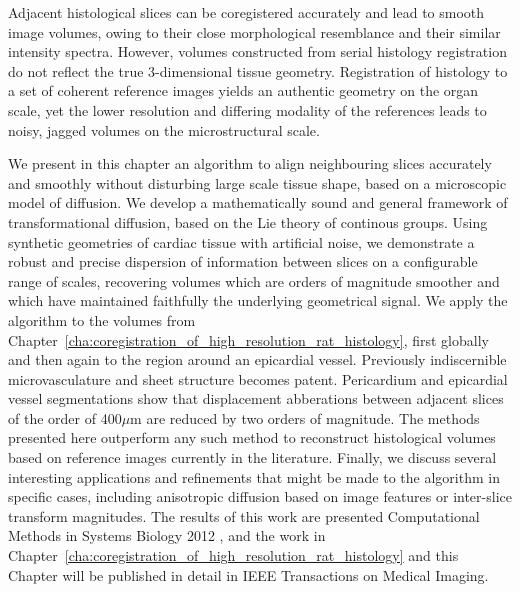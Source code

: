 Adjacent histological slices can be coregistered accurately and lead to smooth image volumes, owing to their close morphological resemblance and their similar intensity spectra. However, volumes constructed from serial histology registration do not reflect the true 3-dimensional tissue geometry. Registration of histology to a set of coherent reference images yields an authentic geometry on the organ scale, yet the lower resolution and differing modality of the references leads to noisy, jagged volumes on the microstructural scale.

We present in this chapter an algorithm to align neighbouring slices accurately and smoothly without disturbing large scale tissue shape, based on a microscopic model of diffusion. We develop a mathematically sound and general framework of transformational diffusion, based on the Lie theory of continous groups. Using synthetic geometries of cardiac tissue with artificial noise, we demonstrate a robust and precise dispersion of information between slices on a configurable range of scales, recovering volumes which are orders of magnitude smoother and which have maintained faithfully the underlying geometrical signal. We apply the algorithm to the volumes from Chapter~\ref{cha:coregistration_of_high_resolution_rat_histology}, first globally and then again to the region around an epicardial vessel. Previously indiscernible microvasculature and sheet structure becomes patent. Pericardium and epicardial vessel segmentations show that displacement abberations between adjacent slices of the order of 400$\mu$m are reduced by two orders of magnitude. The methods presented here outperform any such method to reconstruct histological volumes based on reference images currently in the literature. Finally, we discuss several interesting applications and refinements that might be made to the algorithm in specific cases, including anisotropic diffusion based on image features or inter-slice transform magnitudes. The results of this work are presented Computational Methods in Systems Biology 2012 \cite{Gibb2012}, and the work in Chapter~\ref{cha:coregistration_of_high_resolution_rat_histology} and this Chapter will be published in detail in IEEE Transactions on Medical Imaging.
